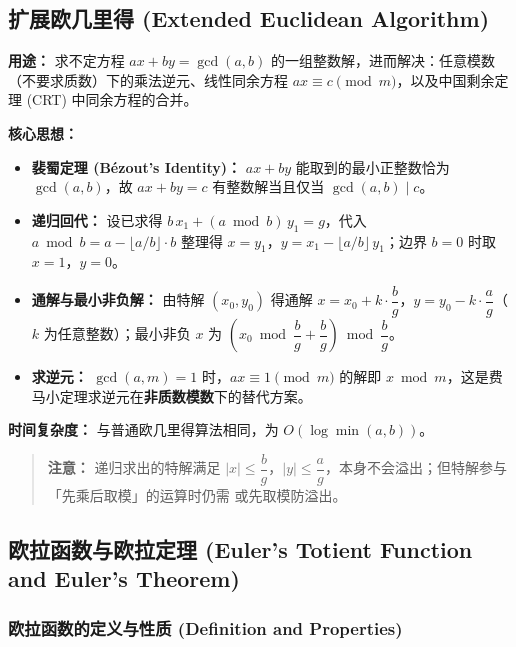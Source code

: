 \subsection{扩展欧几里得 (Extended Euclidean Algorithm)}

\textbf{用途：}
求不定方程 $ax + by = \gcd(a, b)$ 的一组整数解，进而解决：任意模数（不要求质数）下的乘法逆元、线性同余方程 $ax \equiv c \pmod{m}$，以及中国剩余定理 (CRT) 中同余方程的合并。

\textbf{核心思想：}
\begin{itemize}
    \item \textbf{裴蜀定理 (Bézout's Identity)：} $ax + by$ 能取到的最小正整数恰为 $\gcd(a, b)$，故 $ax + by = c$ 有整数解当且仅当 $\gcd(a, b) \mid c$。
    \item \textbf{递归回代：} 设已求得 $b\,x_1 + (a \bmod b)\,y_1 = g$，代入 $a \bmod b = a - \lfloor a/b \rfloor \cdot b$ 整理得 $x = y_1$，$y = x_1 - \lfloor a/b \rfloor\, y_1$；边界 $b = 0$ 时取 $x = 1$，$y = 0$。
    \item \textbf{通解与最小非负解：} 由特解 $(x_0, y_0)$ 得通解 $x = x_0 + k\cdot\dfrac{b}{g}$，$y = y_0 - k\cdot\dfrac{a}{g}$（$k$ 为任意整数）；最小非负 $x$ 为 $\left(x_0 \bmod \dfrac{b}{g} + \dfrac{b}{g}\right) \bmod \dfrac{b}{g}$。
    \item \textbf{求逆元：} $\gcd(a, m) = 1$ 时，$ax \equiv 1 \pmod{m}$ 的解即 $x \bmod m$，这是费马小定理求逆元在\textbf{非质数模数}下的替代方案。
\end{itemize}

\textbf{时间复杂度：} 与普通欧几里得算法相同，为 $O(\log \min(a, b))$。



\begin{quote}
\textbf{注意：} 递归求出的特解满足 $|x| \le \dfrac{b}{g}$，$|y| \le \dfrac{a}{g}$，本身不会溢出；但特解参与「先乘后取模」的运算时仍需  或先取模防溢出。
\end{quote}

\subsection{欧拉函数与欧拉定理 (Euler's Totient Function and Euler's Theorem)}

\subsubsection{欧拉函数的定义与性质 (Definition and Properties)}

